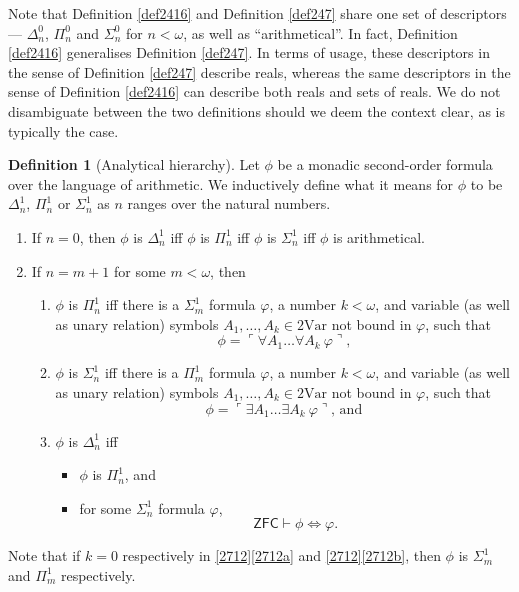 \documentclass[12pt, twoside]{memoir}
\numberwithin{equation}{section}
\theoremstyle{definition}
\newtheorem{defi}[thm]{Definition}
\theoremstyle{remark}
\theoremstyle{definition}
\theoremstyle{definition}
\theoremstyle{definition}
\theoremstyle{remark}
\begin{document}
Note that Definition \ref{def2416} and Definition \ref{def247} share one set of descriptors --- $\Delta^0_n$, $\Pi^0_n$ and $\Sigma^0_n$ for $n < \omega$, as well as ``arithmetical''. In fact, Definition \ref{def2416} generalises Definition \ref{def247}. In terms of usage, these descriptors in the sense of Definition \ref{def247} describe reals, whereas the same descriptors in the sense of Definition \ref{def2416} can describe both reals and sets of reals. We do not disambiguate between the two definitions should we deem the context clear, as is typically the case.

\begin{defi}[Analytical hierarchy]
Let $\phi$ be a monadic second-order formula over the language of arithmetic. We inductively define what it means for $\phi$ to be $\Delta^1_n$, $\Pi^1_n$ or $\Sigma^1_n$ as $n$ ranges over the natural numbers.
\begin{enumerate}[label=(\arabic*)]
    \item If $n = 0$, then $\phi$ is $\Delta^1_n$ iff $\phi$ is $\Pi^1_n$ iff $\phi$ is $\Sigma^1_n$ iff $\phi$ is arithmetical.
    \item If $n = m + 1$ for some $m < \omega$, then 
    \begin{enumerate}[label=(\alph*)]
        \item $\phi$ is $\Pi^1_n$ iff there is a $\Sigma^1_m$ formula $\varphi$, a number $k < \omega$, and variable (as well as unary relation) symbols $A_1, \dots, A_k \in \mathrm{2Var}$ not bound in $\varphi$, such that 
        \begin{equation*}
            \phi = \ulcorner \forall A_1 \dots \forall A_k \ \varphi \urcorner \text{,}
        \end{equation*}
        \item $\phi$ is $\Sigma^1_n$ iff there is a $\Pi^1_m$ formula $\varphi$, a number $k < \omega$, and variable (as well as unary relation) symbols $A_1, \dots, A_k \in \mathrm{2Var}$ not bound in $\varphi$, such that 
        \begin{equation*}
            \phi = \ulcorner \exists A_1 \dots \exists A_k \ \varphi \urcorner \text{, and}
        \end{equation*}
        \item $\phi$ is $\Delta^1_n$ iff 
        \begin{itemize}[label=$\circ$]
            \item $\phi$ is $\Pi^1_n$, and
            \item for some $\Sigma^1_n$ formula $\varphi$,
            \begin{equation*}
                \mathsf{ZFC} \vdash \phi \iff \varphi \text{.}
            \end{equation*}
        \end{itemize}
    \end{enumerate}
\end{enumerate}
Note that if $k = 0$ respectively in \ref{2712}\ref{2712a} and \ref{2712}\ref{2712b}, then $\phi$ is $\Sigma^1_m$ and $\Pi^1_m$ respectively.
\end{defi}
\end{document}

